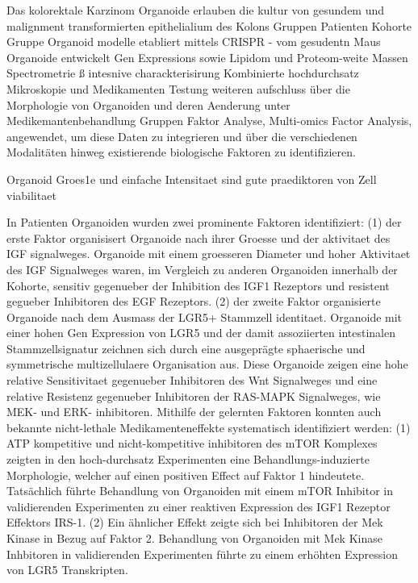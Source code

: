 Das kolorektale Karzinom 
Organoide erlauben die kultur von gesundem und malignment transformierten epithelialium des Kolons
Gruppen Patienten Kohorte
Gruppe Organoid modelle etabliert mittels CRISPR - vom gesudentn Maus Organoide entwickelt
Gen Expressions sowie Lipidom und Proteom-weite Massen Spectrometrie ß intesnive charackterisirung 
Kombinierte hochdurchsatz Mikroskopie und Medikamenten Testung weiteren aufschluss über die Morphologie von Organoiden und deren Aenderung unter Medikemantenbehandlung
Gruppen Faktor Analyse, Multi-omics Factor Analysis, angewendet, um diese Daten zu integrieren und über die verschiedenen Modalitäten hinweg existierende biologische Faktoren zu identifizieren. 

Organoid Groes1e und einfache Intensitaet sind gute praediktoren von Zell viabilitaet 

In Patienten Organoiden wurden zwei prominente Faktoren identifiziert: (1) der erste Faktor organisisert Organoide nach ihrer Groesse und der aktivitaet des IGF signalweges. Organoide mit einem groesseren Diameter und hoher Aktivitaet des IGF Signalweges waren, im Vergleich zu anderen Organoiden innerhalb der Kohorte, sensitiv gegenueber der Inhibition des IGF1 Rezeptors und resistent gegueber Inhibitoren des EGF Rezeptors. 
(2) der zweite Faktor organisierte Organoide nach dem Ausmass der LGR5+ Stammzell identitaet. Organoide mit einer hohen Gen Expression von LGR5 und der damit assoziierten intestinalen Stammzellsignatur zeichnen sich durch eine ausgeprägte sphaerische und symmetrische multizellulaere Organisation aus. Diese Organoide zeigen eine hohe relative Sensitivitaet gegenueber Inhibitoren des Wnt Signalweges und eine relative Resistenz gegenueber Inhibitoren der RAS-MAPK Signalweges, wie MEK- und ERK- inhibitoren. 
Mithilfe der gelernten Faktoren konnten auch bekannte nicht-lethale Medikamenteneffekte systematisch identifiziert werden: (1) ATP kompetitive und nicht-kompetitive inhibitoren des mTOR Komplexes zeigten in den hoch-durchsatz Experimenten eine Behandlungs-induzierte Morphologie, welcher auf einen positiven Effect auf Faktor 1 hindeutete. Tatsächlich führte Behandlung von Organoiden mit einem mTOR Inhibitor in validierenden Experimenten zu einer reaktiven Expression des IGF1 Rezeptor Effektors IRS-1. (2) Ein ähnlicher Effekt zeigte sich bei Inhibitoren der Mek Kinase in Bezug auf Faktor 2. Behandlung von Organoiden mit Mek Kinase Inhbitoren in validierenden Experimenten führte zu einem erhöhten Expression von LGR5 Transkripten.

